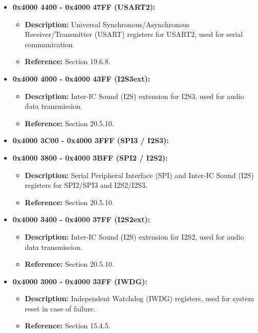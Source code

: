 \documentclass{article}
\begin{document}
\begin{itemize}
\begin{itemize}
        \item \textbf{0x4000 4400 - 0x4000 47FF (USART2):} 
        \begin{itemize}
            \item \textbf{Description:} Universal Synchronous/Asynchronous Receiver/Transmitter (USART) registers for USART2, used for serial communication.
            \item \textbf{Reference:} Section 19.6.8.
        \end{itemize}
        
        \item \textbf{0x4000 4000 - 0x4000 43FF (I2S3ext):}
        \begin{itemize}
            \item \textbf{Description:} Inter-IC Sound (I2S) extension for I2S3, used for audio data transmission.
            \item \textbf{Reference:} Section 20.5.10.
        \end{itemize}
        
        \item \textbf{0x4000 3C00 - 0x4000 3FFF (SPI3 / I2S3):}
        \item \textbf{0x4000 3800 - 0x4000 3BFF (SPI2 / I2S2):}
        \begin{itemize}
            \item \textbf{Description:} Serial Peripheral Interface (SPI) and Inter-IC Sound (I2S) registers for SPI2/SPI3 and I2S2/I2S3.
            \item \textbf{Reference:} Section 20.5.10.
        \end{itemize}
        
        \item \textbf{0x4000 3400 - 0x4000 37FF (I2S2ext):}
        \begin{itemize}
            \item \textbf{Description:} Inter-IC Sound (I2S) extension for I2S2, used for audio data transmission.
            \item \textbf{Reference:} Section 20.5.10.
        \end{itemize}
        
        \item \textbf{0x4000 3000 - 0x4000 33FF (IWDG):}
        \begin{itemize}
            \item \textbf{Description:} Independent Watchdog (IWDG) registers, used for system reset in case of failure.
            \item \textbf{Reference:} Section 15.4.5.
        \end{itemize}
        

\end{itemize}
\end{itemize}
\end{document}
